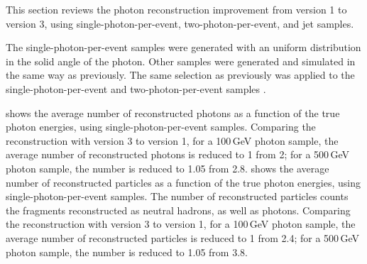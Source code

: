 This section reviews the photon reconstruction improvement  from \pandora version 1 to version 3, using single-photon-per-event, two-photon-per-event, and jet samples.



The single-photon-per-event samples were generated with an uniform distribution in the solid angle of the photon. Other samples were generated and simulated in the same way as previously. The same selection as previously was applied to the  single-photon-per-event and  two-photon-per-event samples .

 shows the average number of reconstructed photons as a function of the true photon energies, using single-photon-per-event samples. Comparing the reconstruction with \pandora version 3 to version 1, for a 100\,GeV photon sample, the average number of reconstructed photons is reduced to 1 from 2; for a 500\,GeV photon sample, the  number is reduced to 1.05 from 2.8.  shows the average number of reconstructed particles as a function of the true photon energies, using single-photon-per-event samples. The number of  reconstructed particles counts the fragments reconstructed as neutral hadrons, as well as photons.   Comparing the reconstruction with \pandora version 3 to version 1,  for a 100\,GeV photon sample, the average number of reconstructed particles is reduced to 1 from 2.4; for a 500\,GeV photon sample, the number is reduced to 1.05 from 3.8.








